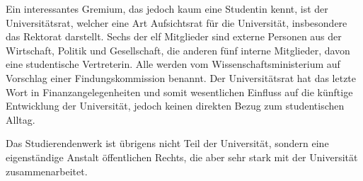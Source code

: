 Ein interessantes Gremium, das jedoch kaum eine Studentin kennt, ist der Universitätsrat, welcher eine Art Aufsichtsrat für die Universität, insbesondere das Rektorat darstellt. Sechs der elf Mitglieder sind externe Personen aus der Wirtschaft, Politik und Gesellschaft, die anderen fünf interne Mitglieder, davon eine studentische Vertreterin. Alle werden vom Wissenschaftsministerium auf Vorschlag einer Findungskommission benannt. Der Universitätsrat hat das letzte Wort in Finanzangelegenheiten und somit wesentlichen Einfluss auf die künftige Entwicklung der Universität, jedoch keinen direkten Bezug zum studentischen Alltag.

Das Studierendenwerk ist übrigens nicht Teil der Universität, sondern eine eigenständige Anstalt öffentlichen Rechts, die aber sehr stark mit der Universität zusammenarbeitet.

\vspace{-2mm}
